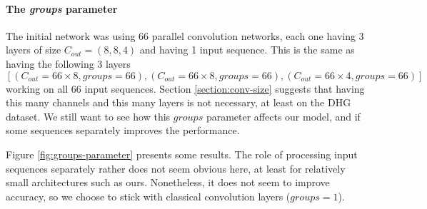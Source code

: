 \documentclass{article}
\begin{document}
\paragraph{The \emph{groups} parameter}
The initial network \cite{Devineau} was using 66 parallel convolution networks, each one having 3 layers of size $C_{out}=(8,8,4)$ and having 1 input sequence. This is the same as having the following 3 layers 
$$[(C_{out}=66\times 8, groups=66), (C_{out}=66\times 8, groups=66), (C_{out}=66\times 4, groups=66)]$$
working on all 66 input sequences.
Section \ref{section:conv-size} suggests that having this many channels and this many layers is not necessary, at least on the DHG dataset.
We still want to see how this $groups$ parameter affects our model, and if some sequences separately improves the performance.
\par
Figure \ref{fig:groups-parameter} presents some results. 
The role of processing input sequences separately rather does not seem obvious here, at least for relatively small architectures such as ours. Nonetheless, it does not seem to improve accuracy, so we choose to stick with classical convolution layers ($groups=1$).
\end{document}
